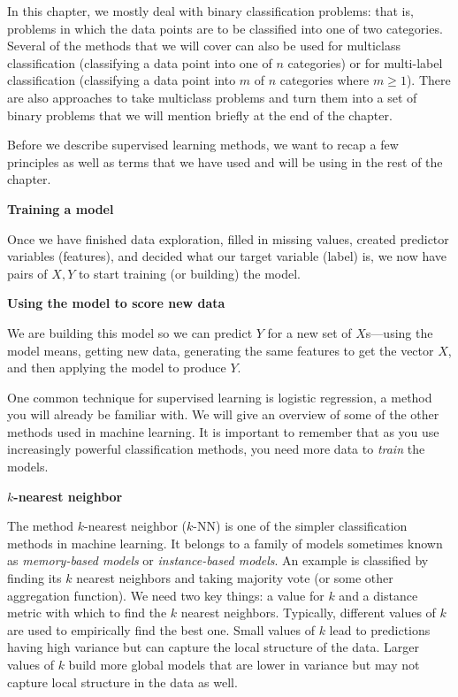 \documentclass[]{krantz}
\begin{document}
In this chapter, we mostly deal with binary classification problems:
that is, problems in which the data points are to be classified into one
of two categories. Several of the methods that we will cover can also be
used for multiclass classification (classifying a data point into one of
\(n\) categories) or for multi-label classification (classifying a data
point into \(m\) of \(n\) categories where \(m\ge1\)). There are also
approaches to take multiclass problems and turn them into a set of
binary problems that we will mention briefly at the end of the chapter.

Before we describe supervised learning methods, we want to recap a few
principles as well as terms that we have used and will be using in the
rest of the chapter.

\textbf{Training a model}

Once we have finished data exploration, filled in missing values,
created predictor variables (features), and decided what our target
variable (label) is, we now have pairs of \(X,Y\) to start training (or
building) the model.

\textbf{Using the model to score new data}

We are building this model so we can predict \(Y\) for a new set of
\(X\)s---using the model means, getting new data, generating the same
features to get the vector \(X\), and then applying the model to produce
\(Y\).

One common technique for supervised learning is logistic regression, a
method you will already be familiar with. We will give an overview of
some of the other methods used in machine learning. It is important to
remember that as you use increasingly powerful classification methods,
you need more data to \emph{train} the models.

\textbf{\(k\)-nearest neighbor}

The method \(k\)-nearest neighbor (\(k\)-NN) is one of the simpler
classification methods in machine learning. It belongs to a family of
models sometimes known as \emph{memory-based models} or
\emph{instance-based models}. An example is classified by finding its
\(k\) nearest neighbors and taking majority vote (or some other
aggregation function). We need two key things: a value for \(k\) and a
distance metric with which to find the \(k\) nearest neighbors.
Typically, different values of \(k\) are used to empirically find the
best one. Small values of \(k\) lead to predictions having high variance
but can capture the local structure of the data. Larger values of \(k\)
build more global models that are lower in variance but may not capture
local structure in the data as well.
\end{document}
